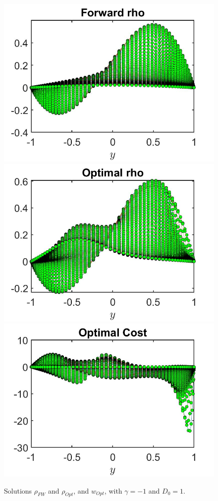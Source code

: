 \documentclass[11pt, a4paper]{article}
\theoremstyle{definition}
\begin{document}
\begin{figure}[h]
	\includegraphics[scale=0.3]{DFlrhoFW2.jpg}	
	\includegraphics[scale=0.3]{DFlrhoOpt2.jpg}
	\includegraphics[scale=0.3]{DFlwOpt2.jpg}
	\caption{Solutions $\rho_{FW}$ and $\rho_{Opt}$,  and $w_{Opt}$, with $\gamma = -1$ and $D_0 = 1$.}
	\label{rhoDFl2}
\end{figure}
\end{document}
